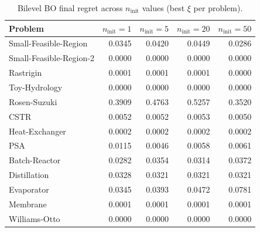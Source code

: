 \documentclass[12pt,a4paper]{article}%
\theoremstyle{plain}%
\theoremstyle{remark}%
\theoremstyle{definition}%
\begin{document}
\begin{appendices}
\begin{table}[htbp]
\centering
\caption{Bilevel BO final regret across $n_\text{init}$ values (best $\xi$ per problem).}
\label{tab:ninit_sensitivity}
\begin{tabular}{@{}lrrrr@{}}
\toprule
\textbf{Problem} & $n_\text{init}=1$ & $n_\text{init}=5$ & $n_\text{init}=20$ & $n_\text{init}=50$ \\
\midrule
Small-Feasible-Region   & 0.0345 & 0.0420 & 0.0449 & 0.0286 \\
Small-Feasible-Region-2 & 0.0000 & 0.0000 & 0.0000 & 0.0000 \\
Rastrigin               & 0.0001 & 0.0001 & 0.0001 & 0.0000 \\
Toy-Hydrology           & 0.0000 & 0.0000 & 0.0000 & 0.0000 \\
Rosen-Suzuki            & 0.3909 & 0.4763 & 0.5257 & 0.3520 \\
CSTR                    & 0.0052 & 0.0052 & 0.0053 & 0.0050 \\
Heat-Exchanger          & 0.0002 & 0.0002 & 0.0002 & 0.0002 \\
PSA                     & 0.0115 & 0.0046 & 0.0058 & 0.0061 \\
Batch-Reactor           & 0.0282 & 0.0354 & 0.0314 & 0.0372 \\
Distillation            & 0.0328 & 0.0321 & 0.0321 & 0.0321 \\
Evaporator              & 0.0345 & 0.0393 & 0.0472 & 0.0781 \\
Membrane                & 0.0001 & 0.0001 & 0.0001 & 0.0001 \\
Williams-Otto           & 0.0000 & 0.0000 & 0.0000 & 0.0000 \\
\bottomrule
\end{tabular}
\end{table}


\end{appendices}
\end{document}
